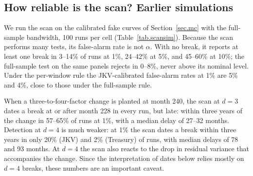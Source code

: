 \documentclass[11pt]{article}
\begin{document}
\subsection{How reliable is the scan? Earlier simulations}

We run the scan on the calibrated fake curves of Section~\ref{sec.mc} with the full-sample bandwidth, 100 runs per cell (Table~\ref{tab.scansim}). Because the scan performs many tests, its false-alarm rate is not $\alpha$. With no break, it reports at least one break in 3--14\% of runs at 1\%, 24--42\% at 5\%, and 45--60\% at 10\%; the full-sample test on the same panels rejects in 0--8\%, never above its nominal level. Under the per-window rule the JKV-calibrated false-alarm rates at 1\% are 5\% and 4\%, close to those under the full-sample rule.

When a three-to-four-factor change is planted at month 240, the scan at $d=3$ dates a break at or after month 228 in every run, but late: within three years of the change in 57--65\% of runs at 1\%, with a median delay of 27--32 months. Detection at $d=4$ is much weaker: at 1\% the scan dates a break within three years in only 20\% (JKV) and 2\% (Treasury) of runs, with median delays of 78 and 93 months. At $d=4$ the scan also reacts to the drop in residual variance that accompanies the change. Since the interpretation of dates below relies mostly on $d=4$ breaks, these numbers are an important caveat.
\end{document}
